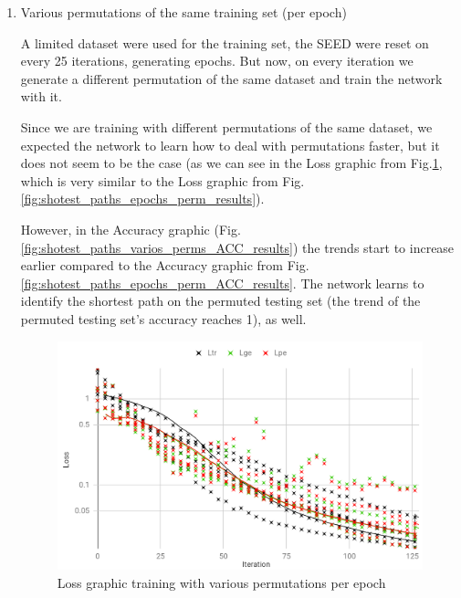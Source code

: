 \begin{enumerate}[label=(\Alph*)]
        \item Various permutations of the same training set (per epoch)
        
        A limited dataset were used for the training set, the SEED were reset on every 25 iterations, generating epochs. But now, on every iteration we generate a different permutation of the same dataset and train the network with it.
        
        Since we are training with different permutations of the same dataset, we expected the network to learn how to deal with permutations faster, but it does not seem to be the case (as we can see in the Loss graphic from Fig.\ref{fig:shotest_paths_varios_perms_results}, which is very similar to the Loss graphic from Fig.\ref{fig:shotest_paths_epochs_perm_results}).
        
        However, in the Accuracy graphic (Fig.\ref{fig:shotest_paths_varios_perms_ACC_results}) the trends start to increase earlier compared to the Accuracy graphic from Fig.\ref{fig:shotest_paths_epochs_perm_ACC_results}. The network learns to identify the shortest path on the permuted testing set (the trend of the permuted testing set's accuracy reaches 1), as well.
        
        \begin{figure}[H]
            \centering
            \includegraphics[width=.9\linewidth]{fig/content/results/shortest_path/various_perms_per_epoch.png}
            \caption{Loss graphic training with various permutations per epoch}
            \label{fig:shotest_paths_varios_perms_results}
        \end{figure}
        

\end{enumerate}

